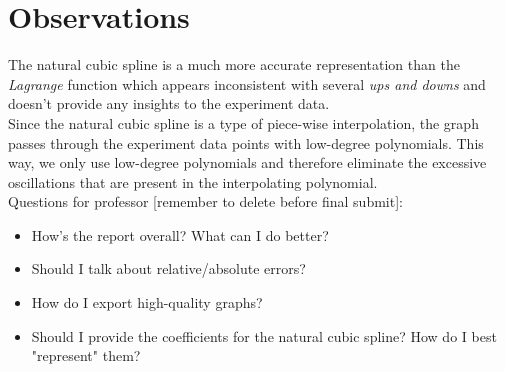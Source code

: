 \documentclass{article}
\begin{document}
\section{Observations}
The natural cubic spline is a much more accurate representation than the {\it Lagrange} function which appears inconsistent with several {\it ups and downs} and doesn't provide any insights to the experiment data.\\

Since the natural cubic spline is a type of piece-wise interpolation, the graph passes through the experiment data points with low-degree polynomials. This way, we only use low-degree polynomials and therefore eliminate the excessive oscillations that are present in the interpolating polynomial.\\

Questions for professor [remember to delete before final submit]:
 \begin{itemize}
  \item How's the report overall? What can I do better?
  \item Should I talk about relative/absolute errors?
  \item How do I export high-quality graphs?
  \item Should I provide the coefficients for the natural cubic spline? How do I best "represent" them?
  \end{itemize}
\end{document}
